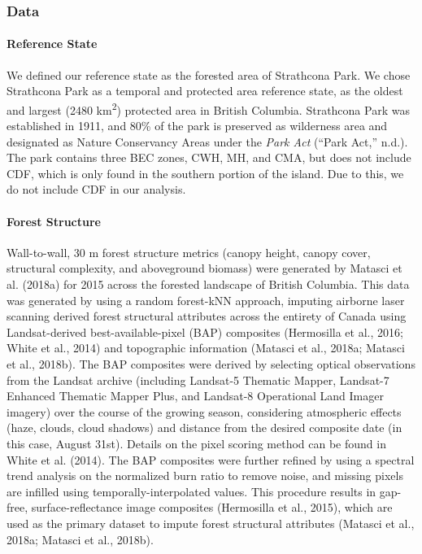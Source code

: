 \documentclass[
]{agujournal2019}
\let\oldparagraph\paragraph
\renewcommand{\paragraph}[1]{\oldparagraph{#1}\mbox{}}
\begin{document}
\subsubsection{Data}\label{data}

\paragraph{Reference State}\label{reference-state}

We defined our reference state as the forested area of Strathcona Park.
We chose Strathcona Park as a temporal and protected area reference
state, as the oldest and largest (2480 km\textsuperscript{2}) protected
area in British Columbia. Strathcona Park was established in 1911, and
80\% of the park is preserved as wilderness area and designated as
Nature Conservancy Areas under the \emph{Park Act} ({``Park {Act},''}
n.d.). The park contains three BEC zones, CWH, MH, and CMA, but does not
include CDF, which is only found in the southern portion of the island.
Due to this, we do not include CDF in our analysis.

\paragraph{Forest Structure}\label{forest-structure}

Wall-to-wall, 30 m forest structure metrics (canopy height, canopy
cover, structural complexity, and aboveground biomass) were generated by
Matasci et al. (2018a) for 2015 across the forested landscape of British
Columbia. This data was generated by using a random forest-kNN approach,
imputing airborne laser scanning derived forest structural attributes
across the entirety of Canada using Landsat-derived best-available-pixel
(BAP) composites (Hermosilla et al., 2016; White et al., 2014) and
topographic information (Matasci et al., 2018a; Matasci et al., 2018b).
The BAP composites were derived by selecting optical observations from
the Landsat archive (including Landsat-5 Thematic Mapper, Landsat-7
Enhanced Thematic Mapper Plus, and Landsat-8 Operational Land Imager
imagery) over the course of the growing season, considering atmospheric
effects (haze, clouds, cloud shadows) and distance from the desired
composite date (in this case, August 31st). Details on the pixel scoring
method can be found in White et al. (2014). The BAP composites were
further refined by using a spectral trend analysis on the normalized
burn ratio to remove noise, and missing pixels are infilled using
temporally-interpolated values. This procedure results in gap-free,
surface-reflectance image composites (Hermosilla et al., 2015), which
are used as the primary dataset to impute forest structural attributes
(Matasci et al., 2018a; Matasci et al., 2018b).
\end{document}
